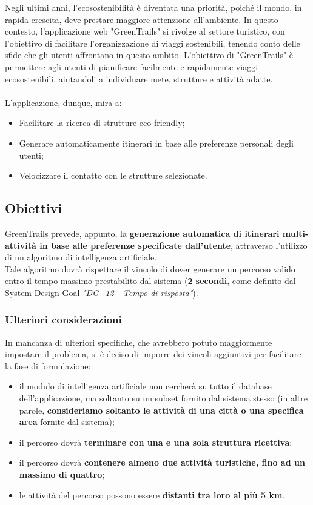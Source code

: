 \documentclass{CSUniSchoolLabReport}
\begin{document}
Negli ultimi anni, l'ecosostenibilità è diventata una priorità, poiché il mondo, in rapida crescita, deve prestare maggiore attenzione all'ambiente. In questo contesto, l'applicazione web "GreenTrails" si rivolge al settore turistico, con l'obiettivo di facilitare l'organizzazione di viaggi sostenibili, tenendo conto delle sfide che gli utenti affrontano in questo ambito.
L'obiettivo di "GreenTrails" è permettere agli utenti di pianificare facilmente e rapidamente viaggi ecosostenibili, aiutandoli a individuare mete, strutture e attività adatte. \\\\
L'applicazione, dunque, mira a:
\begin{itemize}
    \item Facilitare la ricerca di strutture eco-friendly;
    \item Generare automaticamente itinerari in base alle preferenze personali degli utenti;
    \item Velocizzare il contatto con le strutture selezionate.
\end{itemize}


\subsection{Obiettivi}

GreenTrails prevede, appunto, la \textbf{generazione automatica di itinerari multi-attività in base alle preferenze specificate dall'utente}, attraverso l'utilizzo di un algoritmo di intelligenza artificiale. \\
Tale algoritmo dovrà rispettare il vincolo di dover generare un percorso valido entro il tempo massimo prestabilito dal sistema (\textbf{2 secondi}, come definito dal System Design Goal \textit{"DG\_12 - Tempo di risposta"}). 

\subsubsection{Ulteriori considerazioni}

In mancanza di ulteriori specifiche, che avrebbero potuto maggiormente impostare il problema, si è deciso di imporre dei vincoli aggiuntivi per facilitare la fase di formulazione:
\begin{itemize}
	\item il modulo di intelligenza artificiale non cercherà su tutto il database dell'applicazione, ma soltanto su un subset fornito dal sistema stesso (in altre parole, \textbf{consideriamo soltanto le attività di una città o una specifica area} fornite dal sistema);
	\item il percorso dovrà \textbf{terminare con una e una sola struttura ricettiva};
	\item il percorso dovrà \textbf{contenere almeno due attività turistiche, fino ad un massimo di quattro};
	\item le attività del percorso possono essere \textbf{distanti tra loro al più 5 km}.
\end{itemize}
\end{document}
